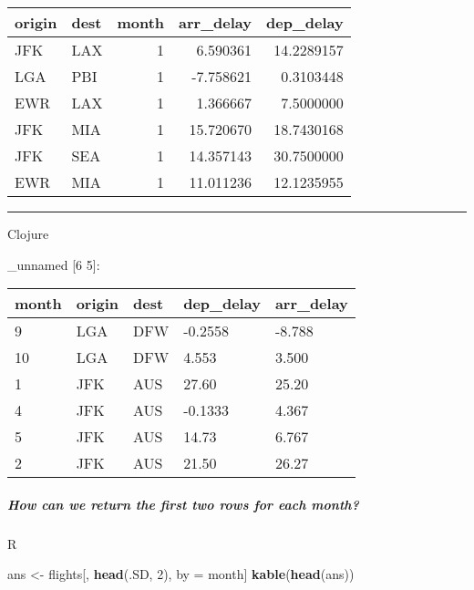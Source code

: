 \documentclass[]{article}
\newenvironment{Shaded}{\begin{snugshade}}{\end{snugshade}}
\newcommand{\KeywordTok}[1]{\textcolor[rgb]{0.13,0.29,0.53}{\textbf{#1}}}
\newcommand{\DecValTok}[1]{\textcolor[rgb]{0.00,0.00,0.81}{#1}}
\newcommand{\StringTok}[1]{\textcolor[rgb]{0.31,0.60,0.02}{#1}}
\newcommand{\VariableTok}[1]{\textcolor[rgb]{0.00,0.00,0.00}{#1}}
\newcommand{\NormalTok}[1]{#1}
\let\oldsubparagraph\subparagraph
\renewcommand{\subparagraph}[1]{\oldsubparagraph{#1}\mbox{}}
\begin{document}
\begin{longtable}[]{@{}llrrr@{}}
\toprule
origin & dest & month & arr\_delay & dep\_delay\tabularnewline
\midrule
\endhead
JFK & LAX & 1 & 6.590361 & 14.2289157\tabularnewline
LGA & PBI & 1 & -7.758621 & 0.3103448\tabularnewline
EWR & LAX & 1 & 1.366667 & 7.5000000\tabularnewline
JFK & MIA & 1 & 15.720670 & 18.7430168\tabularnewline
JFK & SEA & 1 & 14.357143 & 30.7500000\tabularnewline
EWR & MIA & 1 & 11.011236 & 12.1235955\tabularnewline
\bottomrule
\end{longtable}

\begin{center}\rule{0.5\linewidth}{0.5pt}\end{center}

Clojure

\begin{Shaded}
\end{Shaded}

\_unnamed {[}6 5{]}:

\begin{longtable}[]{@{}lllll@{}}
\toprule
month & origin & dest & dep\_delay & arr\_delay\tabularnewline
\midrule
\endhead
9 & LGA & DFW & -0.2558 & -8.788\tabularnewline
10 & LGA & DFW & 4.553 & 3.500\tabularnewline
1 & JFK & AUS & 27.60 & 25.20\tabularnewline
4 & JFK & AUS & -0.1333 & 4.367\tabularnewline
5 & JFK & AUS & 14.73 & 6.767\tabularnewline
2 & JFK & AUS & 21.50 & 26.27\tabularnewline
\bottomrule
\end{longtable}

\subparagraph{How can we return the first two rows for each
month?}\label{how-can-we-return-the-first-two-rows-for-each-month}

R

\begin{Shaded}
\begin{Highlighting}[]
\NormalTok{ans <-}\StringTok{ }\NormalTok{flights[, }\KeywordTok{head}\NormalTok{(.SD, }\DecValTok{2}\NormalTok{), by =}\StringTok{ }\NormalTok{month]}
\KeywordTok{kable}\NormalTok{(}\KeywordTok{head}\NormalTok{(ans))}
\end{Highlighting}
\end{Shaded}
\end{document}
